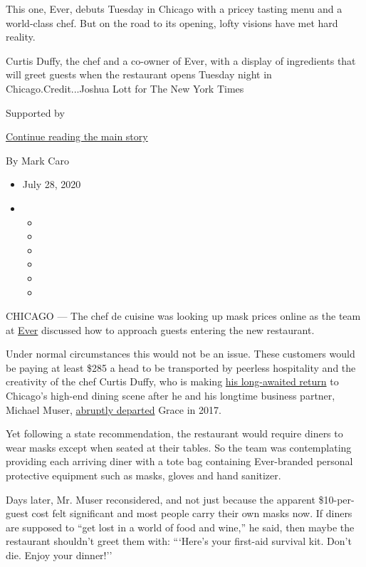 This one, Ever, debuts Tuesday in Chicago with a pricey tasting menu and
a world-class chef. But on the road to its opening, lofty visions have
met hard reality.

Curtis Duffy, the chef and a co-owner of Ever, with a display of
ingredients that will greet guests when the restaurant opens Tuesday
night in Chicago.Credit...Joshua Lott for The New York Times

Supported by

\protect\hyperlink{after-sponsor}{Continue reading the main story}

By Mark Caro

\begin{itemize}
\item
  July 28, 2020
\item
  \begin{itemize}
  \item
  \item
  \item
  \item
  \item
  \item
  \end{itemize}
\end{itemize}

CHICAGO --- The chef de cuisine was looking up mask prices online as the
team at \href{https://www.ever-restaurant.com/}{Ever} discussed how to
approach guests entering the new restaurant.

Under normal circumstances this would not be an issue. These customers
would be paying at least \$285 a head to be transported by peerless
hospitality and the creativity of the chef Curtis Duffy, who is making
\href{https://www.nytimes.com/2019/06/24/dining/ever-restaurant-chicago-curtis-duffy.html}{his
long-awaited return} to Chicago's high-end dining scene after he and his
longtime business partner, Michael Muser,
\href{https://www.nytimes.com/2017/12/20/dining/grace-chicago-chefs-quit.html}{abruptly
departed} Grace in 2017.

Yet following a state recommendation, the restaurant would require
diners to wear masks except when seated at their tables. So the team was
contemplating providing each arriving diner with a tote bag containing
Ever-branded personal protective equipment such as masks, gloves and
hand sanitizer.

Days later, Mr. Muser reconsidered, and not just because the apparent
\$10-per-guest cost felt significant and most people carry their own
masks now. If diners are supposed to ``get lost in a world of food and
wine,'' he said, then maybe the restaurant shouldn't greet them with:
```Here's your first-aid survival kit. Don't die. Enjoy your dinner!''

